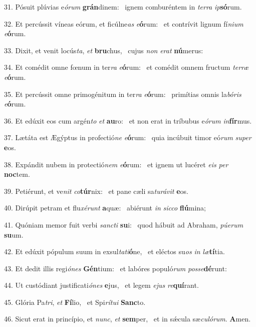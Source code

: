 31. Pósuit plúvias e\textit{ó}\textit{rum} \textbf{grán}dinem: \ast\  ignem comburéntem in \textit{ter}\textit{ra} \textit{ip}\textbf{só}rum.\

32. Et percússit víneas eórum, et ficúlne\textit{as} \textit{e}\textbf{ó}rum: \ast\  et contrívit lignum fí\textit{ni}\textit{um} \textit{e}\textbf{ó}rum.\

33. Dixit, et venit locús\textit{ta}, \textit{et} \textbf{bru}chus, \ast\  cujus \textit{non} \textit{e}\textit{rat} \textbf{nú}merus:\

34. Et comédit omne fœnum in ter\textit{ra} \textit{e}\textbf{ó}rum: \ast\  et comédit omnem fructum \textit{ter}\textit{ræ} \textit{e}\textbf{ó}rum.\

35. Et percússit omne primogénitum in ter\textit{ra} \textit{e}\textbf{ó}rum: \ast\  primítias omnis la\textit{bó}\textit{ris} \textit{e}\textbf{ó}rum.\

36. Et edúxit eos cum argén\textit{to} \textit{et} \textbf{au}ro: \ast\  et non erat in tríbubus e\textit{ó}\textit{rum} \textit{in}\textbf{fír}mus.\

37. Lætáta est Ægýptus in profectió\textit{ne} \textit{e}\textbf{ó}rum: \ast\  quia incúbuit timor eó\textit{rum} \textit{su}\textit{per} \textbf{e}os.\

38. Expándit nubem in protectió\textit{nem} \textit{e}\textbf{ó}rum: \ast\  et ignem ut lucéret \textit{e}\textit{is} \textit{per} \textbf{noc}tem.\

39. Petiérunt, et ve\textit{nit} \textit{co}\textbf{túr}nix: \ast\  et pane cæli sa\textit{tu}\textit{rá}\textit{vit} \textbf{e}os.\

40. Dirúpit petram et flu\textit{xé}\textit{runt} \textbf{a}quæ: \ast\  abiérunt \textit{in} \textit{sic}\textit{co} \textbf{flú}mina;\

41. Quóniam memor fuit verbi \textit{sanc}\textit{ti} \textbf{su}i: \ast\  quod hábuit ad Abraham, \textit{pú}\textit{e}\textit{rum} \textbf{su}um.\

42. Et edúxit pópulum suum in exsul\textit{ta}\textit{ti}\textbf{ó}ne, \ast\  et eléctos su\textit{os} \textit{in} \textit{læ}\textbf{tí}tia.\

43. Et dedit illis regi\textit{ó}\textit{nes} \textbf{Gén}tium: \ast\  et labóres populó\textit{rum} \textit{pos}\textit{se}\textbf{dé}runt:\

44. Ut custódiant justificati\textit{ó}\textit{nes} \textbf{e}jus, \ast\  et legem \textit{e}\textit{jus} \textit{re}\textbf{quí}rant.\

45. Glória Pa\textit{tri}, \textit{et} \textbf{Fí}lio, \ast\  et Spi\textit{rí}\textit{tu}\textit{i} \textbf{Sanc}to.\

46. Sicut erat in princípio, et \textit{nunc}, \textit{et} \textbf{sem}per, \ast\  et in sǽcula sæ\textit{cu}\textit{ló}\textit{rum}. \textbf{A}men.\

